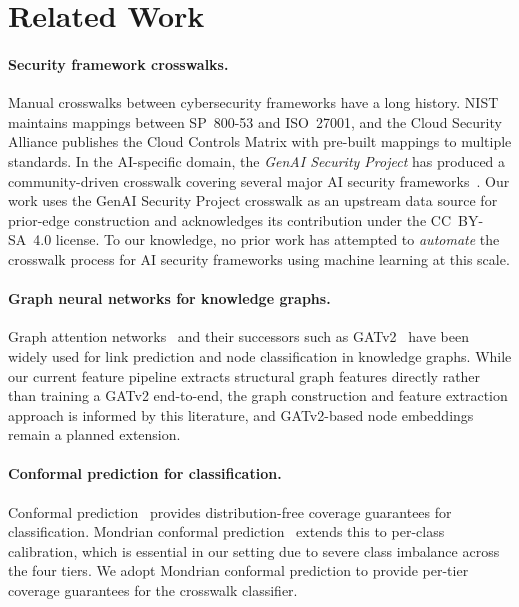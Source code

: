 \section{Related Work}
\label{sec:related}

\paragraph{Security framework crosswalks.}
Manual crosswalks between cybersecurity frameworks have a long history.
NIST maintains mappings between SP~800-53 and ISO~27001, and the Cloud
Security Alliance publishes the Cloud Controls Matrix with pre-built
mappings to multiple standards. In the AI-specific domain, the
\emph{GenAI Security Project} has produced a community-driven crosswalk
covering several major AI security
frameworks~\citep{genai_security_project}. Our work uses the GenAI
Security Project crosswalk as an upstream data source for prior-edge
construction and acknowledges its contribution under the CC~BY-SA~4.0
license. To our knowledge, no prior work has attempted to
\emph{automate} the crosswalk process for AI security frameworks using
machine learning at this scale.

\paragraph{Graph neural networks for knowledge graphs.}
Graph attention networks~\citep{velickovic2018gat} and their successors
such as GATv2~\citep{brody2022gatv2} have been widely used for link
prediction and node classification in knowledge graphs. While our
current feature pipeline extracts structural graph features directly
rather than training a GATv2 end-to-end, the graph construction and
feature extraction approach is informed by this literature, and
GATv2-based node embeddings remain a planned extension.

\paragraph{Conformal prediction for classification.}
Conformal prediction~\citep{vovk2005conformal} provides
distribution-free coverage guarantees for classification. Mondrian
conformal prediction~\citep{romano2020malice} extends this to
per-class calibration, which is essential in our setting due to severe
class imbalance across the four tiers. We adopt Mondrian conformal
prediction to provide per-tier coverage guarantees for the crosswalk
classifier.


